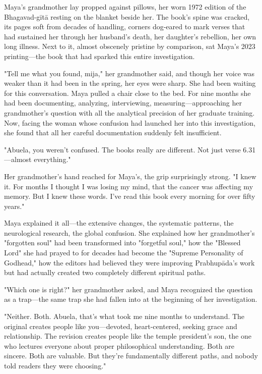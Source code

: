 \documentclass[12pt,twoside]{book}
\begin{document}
Maya's grandmother lay propped against pillows, her worn 1972 edition of the Bhagavad-gītā resting on the blanket beside her. The book's spine was cracked, its pages soft from decades of handling, corners dog-eared to mark verses that had sustained her through her husband's death, her daughter's rebellion, her own long illness. Next to it, almost obscenely pristine by comparison, sat Maya's 2023 printing—the book that had sparked this entire investigation.

"Tell me what you found, mija," her grandmother said, and though her voice was weaker than it had been in the spring, her eyes were sharp. She had been waiting for this conversation.
Maya pulled a chair close to the bed. For nine months she had been documenting, analyzing, interviewing, measuring—approaching her grandmother's question with all the analytical precision of her graduate training. Now, facing the woman whose confusion had launched her into this investigation, she found that all her careful documentation suddenly felt insufficient.

"Abuela, you weren't confused. The books really are different. Not just verse 6.31—almost everything."

Her grandmother's hand reached for Maya's, the grip surprisingly strong. "I knew it. For months I thought I was losing my mind, that the cancer was affecting my memory. But I knew these words. I've read this book every morning for over fifty years."

Maya explained it all—the extensive changes, the systematic patterns, the neurological research, the global confusion. She explained how her grandmother's "forgotten soul" had been transformed into "forgetful soul," how the "Blessed Lord" she had prayed to for decades had become the "Supreme Personality of Godhead," how the editors had believed they were improving Prabhupāda's work but had actually created two completely different spiritual paths.

"Which one is right?" her grandmother asked, and Maya recognized the question as a trap—the same trap she had fallen into at the beginning of her investigation.

"Neither. Both. Abuela, that's what took me nine months to understand. The original creates people like you—devoted, heart-centered, seeking grace and relationship. The revision creates people like the temple president's son, the one who lectures everyone about proper philosophical understanding. Both are sincere. Both are valuable. But they're fundamentally different paths, and nobody told readers they were choosing."
\end{document}
